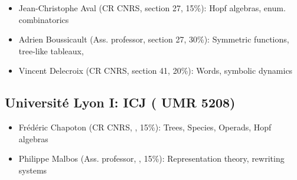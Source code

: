 \begin{itemize}
\item Jean-Christophe Aval (CR CNRS, section 27, 15\%): %
  Hopf algebras, enum. combinatorics%
\item Adrien Boussicault (Ass. professor, section 27, 30\%): %
  Symmetric functions, tree-like tableaux, %
\item Vincent Delecroix (CR CNRS, section 41, 20\%): Words, symbolic dynamics
\end{itemize}

\vspace{-1.2ex}
\subsection*{Université Lyon I: ICJ (%
  UMR 5208)}
\begin{itemize}
\item Frédéric Chapoton (CR CNRS, \MATH, 15\%): %
  Trees, Species, Operads, Hopf algebras
\item Philippe Malbos (Ass. professor, \MATH, 15\%): %
  Representation theory, %
  rewriting systems%
\end{itemize}




